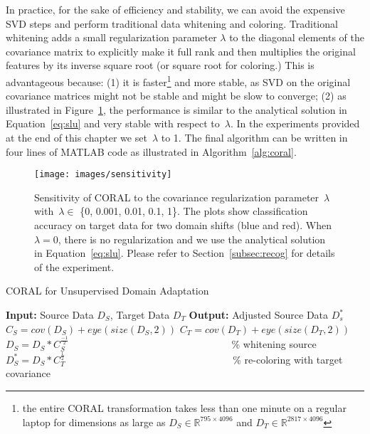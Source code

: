 \documentclass[graybox]{svmult}
\begin{document}
In practice, for the sake of efficiency and stability, we can avoid the expensive SVD steps and perform traditional data whitening and coloring.
Traditional whitening adds a small regularization parameter $\lambda$ to the diagonal elements of the covariance matrix to explicitly make it full rank and then multiplies the original features by its inverse square root (or square root for coloring.) 
This is advantageous because: (1) 
it is faster\footnote{the entire CORAL transformation takes less than one minute on a regular laptop for dimensions as large as $D_S\in\mathbb{R}^{795\times4096}$ and $D_T\in\mathbb{R}^{2817\times4096}$} and more stable, as SVD on the original covariance matrices might not be stable and might be slow to converge; (2) as illustrated in Figure~\ref{fig:sens}, the performance is similar to the analytical solution in Equation~\eqref{eq:slu} and very stable with respect to~$\lambda$. In the experiments provided at the end of this chapter we set~$\lambda$ to 1. The final algorithm can be written in four lines of MATLAB code as illustrated in Algorithm~\ref{alg:coral}.
 
\begin{figure}
\centering
\texttt{[image: images/sensitivity]}
\caption{\small Sensitivity of CORAL to the covariance regularization parameter~$\lambda$ with~$\lambda \in$ \{0, 0.001, 0.01, 0.1, 1\}. The plots show classification accuracy on target data for two domain shifts (blue and red). When $\lambda = 0$, there is no regularization and we use the analytical solution in Equation~\eqref{eq:slu}. Please refer to Section~\ref{subsec:recog} for details of the experiment.}
\label{fig:sens}
\end{figure}

\begin{algorithm}
\caption{CORAL for Unsupervised Domain Adaptation}
\begin{small}
\begin{algorithmic} 
\STATE \textbf{Input:} Source Data $D_S$, Target Data $D_T$
\STATE \textbf{Output:} Adjusted Source Data $D_{s}^{*}$
\STATE $C_S = cov(D_S) + eye(size(D_S, 2))$
\STATE $C_T = cov(D_T) + eye(size(D_T, 2))$
\STATE $D_S = D_S*C_S^{\frac{-1}{2}}$  ~~~~~~~~~~~~~~~~~~~~~~~~~~~~~~~~\% whitening source
\STATE $D_{S}^{*} = D_S*C_T^{\frac{1}{2}}$  ~~~~~~~~~~~~~~~~~~~~~~~~~~~~~~~~~\% re-coloring with target covariance
\end{algorithmic} 
\end{small}
\label{alg:coral}
\end{algorithm}
\end{document}
